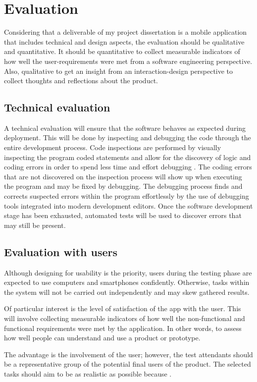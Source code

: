 \section{Evaluation}
Considering that a deliverable of my project dissertation is a mobile application that includes technical and design aspects, the evaluation should be qualitative and quantitative. It should be quantitative to collect measurable indicators of how well the user-requirements were met from a software engineering perspective. Also, qualitative to get an insight from an interaction-design perspective to collect thoughts and reflections about the product.

\subsection{Technical evaluation}
A technical evaluation will ensure that the software behaves as expected during deployment. This will be done by inspecting and debugging the code through the entire development process. Code inspections are performed by visually inspecting the program coded statements and allow for the discovery of logic and coding errors in order to spend less time and effort debugging \cite{Myers2011}. The coding errors that are not discovered on the inspection process will show up when executing the program and may be fixed by debugging. The debugging process finds and corrects suspected errors within the program effortlessly by the use of debugging tools integrated into modern development editors. Once the software development stage has been exhausted, automated tests will be used to discover errors that may still be present.

\subsection{Evaluation with users}
Although designing for usability is the priority, users during the testing phase are expected to use computers and smartphones confidently. Otherwise, tasks within the system will not be carried out independently and may skew gathered results. 

Of particular interest is the level of satisfaction of the app with the user. This will involve collecting measurable indicators of how well the non-functional and functional requirements were met by the application. In other words, to assess how well people can understand and use a product or prototype.

 \cite{Scholtz2003} The advantage is the involvement of the user; however, the test attendants should be a representative group of the potential final users of the product. The selected tasks should aim to be as realistic as possible because . \cite{Scholtz2003}

